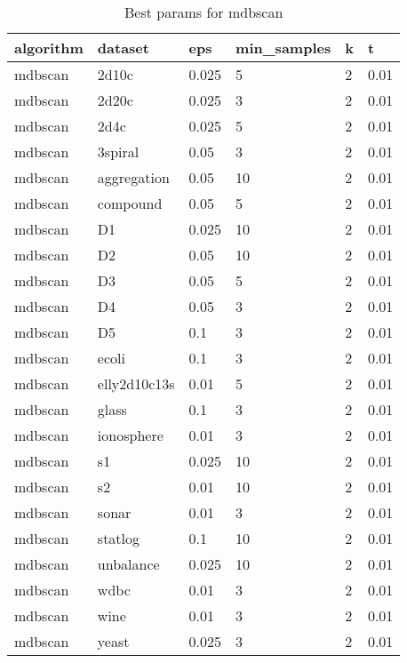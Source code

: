 \begin{table}[H]
\centering
\caption{Best params for mdbscan}
\label{tab:params:mdbscan}
\begin{tabular}{|l|l|l|l|l|l|}
\hline
algorithm & dataset & eps & min\_samples & k & t \\
\hline
mdbscan & 2d10c & 0.025 & 5 & 2 & 0.01 \\
\hline
mdbscan & 2d20c & 0.025 & 3 & 2 & 0.01 \\
\hline
mdbscan & 2d4c & 0.025 & 5 & 2 & 0.01 \\
\hline
mdbscan & 3spiral & 0.05 & 3 & 2 & 0.01 \\
\hline
mdbscan & aggregation & 0.05 & 10 & 2 & 0.01 \\
\hline
mdbscan & compound & 0.05 & 5 & 2 & 0.01 \\
\hline
mdbscan & D1 & 0.025 & 10 & 2 & 0.01 \\
\hline
mdbscan & D2 & 0.05 & 10 & 2 & 0.01 \\
\hline
mdbscan & D3 & 0.05 & 5 & 2 & 0.01 \\
\hline
mdbscan & D4 & 0.05 & 3 & 2 & 0.01 \\
\hline
mdbscan & D5 & 0.1 & 3 & 2 & 0.01 \\
\hline
mdbscan & ecoli & 0.1 & 3 & 2 & 0.01 \\
\hline
mdbscan & elly2d10c13s & 0.01 & 5 & 2 & 0.01 \\
\hline
mdbscan & glass & 0.1 & 3 & 2 & 0.01 \\
\hline
mdbscan & ionosphere & 0.01 & 3 & 2 & 0.01 \\
\hline
mdbscan & s1 & 0.025 & 10 & 2 & 0.01 \\
\hline
mdbscan & s2 & 0.01 & 10 & 2 & 0.01 \\
\hline
mdbscan & sonar & 0.01 & 3 & 2 & 0.01 \\
\hline
mdbscan & statlog & 0.1 & 10 & 2 & 0.01 \\
\hline
mdbscan & unbalance & 0.025 & 10 & 2 & 0.01 \\
\hline
mdbscan & wdbc & 0.01 & 3 & 2 & 0.01 \\
\hline
mdbscan & wine & 0.01 & 3 & 2 & 0.01 \\
\hline
mdbscan & yeast & 0.025 & 3 & 2 & 0.01 \\
\hline
\end{tabular}
\end{table}
